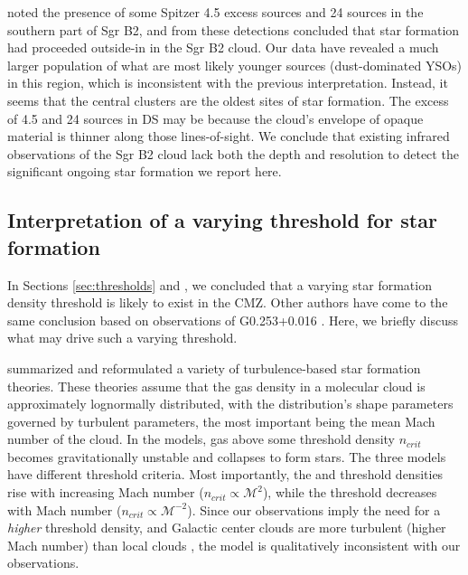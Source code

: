 \documentclass[twocolumn]{aastex61}
\begin{document}
\citet{Yusef-Zadeh2009a} noted the presence of some Spitzer 4.5 \um excess
sources and 24 \um sources in the southern part of Sgr B2, and from these
detections concluded that star formation had proceeded outside-in in the Sgr B2
cloud.  Our data have revealed a much larger population of what are most likely
younger sources (dust-dominated YSOs) in this region, which is
inconsistent with the previous interpretation.  Instead, it seems that the
central clusters are the oldest sites of star formation.  The excess of 4.5 \um
and 24 \um sources in DS may be because the cloud's envelope of opaque material
is thinner along those lines-of-sight.  We conclude that existing infrared
observations of the Sgr B2 cloud lack both the depth and resolution to detect
the significant ongoing star formation we report here.

\subsection{Interpretation of a varying threshold for star formation}
\label{sec:turbsftheory}
In Sections \ref{sec:thresholds} and \label{sec:gutermuth}, we concluded that a
varying star formation density threshold is likely to exist in the CMZ.  Other
authors have come to the same conclusion based on observations of G0.253+0.016
\citep{Rathborne2014a,Kruijssen2014c}.  Here, we briefly discuss what may drive
such a varying threshold.

\citet{Federrath2012a} summarized and reformulated a variety of
turbulence-based star formation theories.  These theories assume that the gas
density in a molecular cloud is approximately lognormally distributed, with the
distribution's shape parameters governed by turbulent parameters, the most
important being the mean Mach number of the cloud.  In the models, gas above
some threshold density $n_{crit}$ becomes gravitationally unstable and
collapses to form stars.  The three models
\citep{Krumholz2005a,Padoan2011a,Hennebelle2011a} have different threshold
criteria.  Most importantly, the \citet{Krumholz2005a} and \citet{Padoan2011a}
threshold densities rise with increasing Mach number
($n_{crit}\propto\mathcal{M}^2$), while the \citet{Hennebelle2011a} threshold
decreases with Mach number ($n_{crit}\propto \mathcal{M}^{-2}$).  Since our
observations imply the need for a \emph{higher} threshold density, and Galactic
center clouds are more turbulent (higher Mach number) than local clouds
\citep[e.g.,][]{Federrath2016a}, the \citet{Hennebelle2011a} model is
qualitatively inconsistent with our observations.
\end{document}
